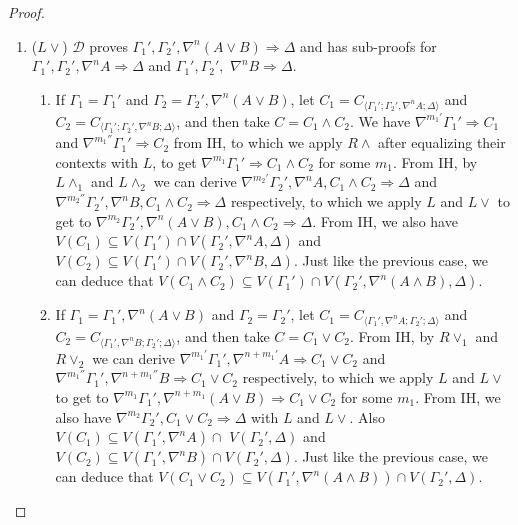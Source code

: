 \documentclass[12pt,a4paper]{article}
\theoremstyle{plain}
\theoremstyle{definition}
\begin{document}
\begin{proof}
\begin{enumerate}
		\item ($L\lor$) $\mathcal{D}$ proves $\Gamma_1' , \Gamma_2' , \nabla^n (A \lor B) \Rightarrow \Delta$ and has sub-proofs for $\Gamma_1' , \Gamma_2' , \nabla^n A \Rightarrow \Delta$ and $\Gamma_1' , \Gamma_2' ,$ $\nabla^n B \Rightarrow \Delta$.
		\begin{enumerate}
			\item If $\Gamma_1 = \Gamma_1'$ and $\Gamma_2 = \Gamma_2' , \nabla^n (A \lor B)$, let $C_1 = C_{\langle\Gamma_1';\Gamma_2',\nabla^n A;\Delta\rangle}$ and $C_2 = C_{\langle\Gamma_1';\Gamma_2',\nabla^n B;\Delta\rangle}$, and then take $C = C_1 \land C_2$.
			We have $\nabla^{m_1'} \Gamma_1' \Rightarrow C_1$ and $\nabla^{m_1''} \Gamma_1' \Rightarrow C_2$ from IH, to which we apply $R\land$ after equalizing their contexts with $L$, to get $\nabla^{m_1} \Gamma_1' \Rightarrow C_1 \land C_2$ for some $m_1$.
			From IH, by $L\land_1$ and $L\land_2$ we can derive $\nabla^{m_2'}\Gamma_2' , \nabla^n A , C_1 \land C_2 \Rightarrow \Delta$ and $\nabla^{m_2''} \Gamma_2' , \nabla^n B , C_1 \land C_2 \Rightarrow \Delta$ respectively, to which we apply $L$ and $L\lor$ to get to $\nabla^{m_2} \Gamma_2' , \nabla^n (A \lor B) , C_1 \land C_2 \Rightarrow \Delta$.
			From IH, we also have $V(C_1) \subseteq V(\Gamma_1') \cap V(\Gamma_2' , \nabla^n A , \Delta)$ and $V(C_2) \subseteq V(\Gamma_1') \cap V(\Gamma_2' , \nabla^n B , \Delta)$. Just like the previous case, we can deduce that $V(C_1 \land C_2) \subseteq V(\Gamma_1') \cap V(\Gamma_2' , \nabla^n (A \land B) , \Delta)$.

			\item If $\Gamma_1 = \Gamma_1' , \nabla^n (A \lor B)$ and $\Gamma_2 = \Gamma_2'$, let $C_1 = C_{\langle\Gamma_1',\nabla^n A;\Gamma_2';\Delta\rangle}$ and $C_2 = C_{\langle\Gamma_1',\nabla^n B;\Gamma_2';\Delta\rangle}$, and then take $C = C_1 \lor C_2$.
			From IH, by $R\lor_1$ and $R\lor_2$ we can derive $\nabla^{m_1'} \Gamma_1',\nabla^{n+m_1'} A \Rightarrow C_1 \lor C_2$ and $\nabla^{m_1''} \Gamma_1', \nabla^{n+m_1''} B \Rightarrow C_1 \lor C_2$ respectively, to which we apply $L$ and $L\vee$ to get to $\nabla^{m_1} \Gamma_1', \nabla^{n+m_1} (A \lor B) \Rightarrow C_1 \lor C_2$ for some $m_1$.
			From IH, we also have $\nabla^{m_2} \Gamma_2' , C_1 \lor C_2 \Rightarrow \Delta$ with $L$ and $L\lor$.
			Also $V(C_1) \subseteq V(\Gamma_1' , \nabla^n A) \cap$ $V(\Gamma_2' , \Delta)$ and $V(C_2) \subseteq V(\Gamma_1' , \nabla^n B) \cap V(\Gamma_2' , \Delta)$. Just like the previous case, we can deduce that $V(C_1 \lor C_2) \subseteq V(\Gamma_1' , \nabla^n (A \land B)) \cap V(\Gamma_2' , \Delta)$.
		\end{enumerate}


\end{enumerate}
\end{proof}
\end{document}
